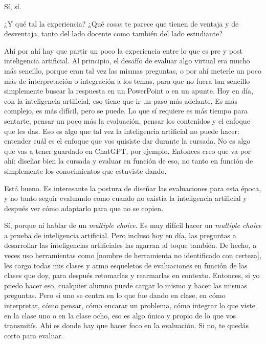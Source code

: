 \begin{description}[leftmargin=0cm, labelsep=0.5cm, style=nextline]
\item[\textbf{Entrevistado:}] Sí, sí.
\item[\textbf{Entrevistadores:}] ¿Y qué tal la experiencia? ¿Qué cosas te parece que tienen de ventaja y de desventaja, tanto del lado docente como también del lado estudiante?
\item[\textbf{Entrevistado:}] Ahí por ahí hay que partir un poco la experiencia entre lo que es pre y post inteligencia artificial. Al principio, el desafío de evaluar algo virtual era mucho más sencillo, porque eran tal vez las mismas preguntas, o por ahí meterle un poco más de interpretación o integración a los temas, para que no fuera tan sencillo simplemente buscar la respuesta en un PowerPoint o en un apunte. Hoy en día, con la inteligencia artificial, eso tiene que ir un paso más adelante. Es más complejo, es más difícil, pero se puede. Lo que sí requiere es más tiempo para sentarte, pensar un poco más la evaluación, pensar los contenidos y el enfoque que les das. Eso es algo que tal vez la inteligencia artificial no puede hacer: entender cuál es el enfoque que vos quisiste dar durante la cursada. No es algo que vas a tener guardado en ChatGPT, por ejemplo. Entonces creo que va por ahí: diseñar bien la cursada y evaluar en función de eso, no tanto en función de simplemente los conocimientos que estuviste dando.
\item[\textbf{Entrevistadores:}] Está bueno. Es interesante la postura de diseñar las evaluaciones para esta época, y no tanto seguir evaluando como cuando no existía la inteligencia artificial y después ver cómo adaptarlo para que no se copien.
\item[\textbf{Entrevistado:}] Sí, porque ni hablar de un \textit{multiple choice}. Es muy difícil hacer un \textit{multiple choice} a prueba de inteligencia artificial. Pero incluso hoy en día, las preguntas a desarrollar las inteligencias artificiales las agarran al toque también. De hecho, a veces uso herramientas como [nombre de herramienta no identificado con certeza], les cargo todas mis clases y armo esqueletos de evaluaciones en función de las clases que doy, para después retomarlas y rearmarlas en contexto. Entonces, si yo puedo hacer eso, cualquier alumno puede cargar lo mismo y hacer las mismas preguntas. Pero si uno se centra en lo que fue dando en clase, en cómo interpretar, cómo pensar, cómo encarar un problema, cómo integrar lo que viste en la clase uno o en la clase ocho, eso es algo único y propio de lo que vos transmitís. Ahí es donde hay que hacer foco en la evaluación. Si no, te quedás corto para evaluar.

\end{description}
